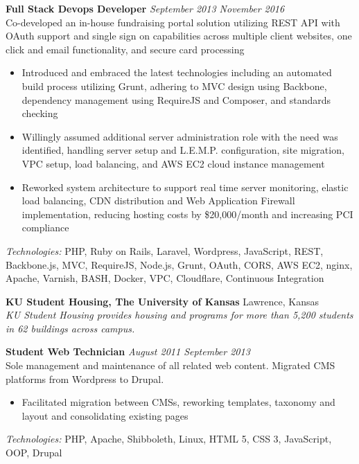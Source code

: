 \documentclass[10pt]{article}
\begin{document}
\begin{addmargin}[1em]{0em}
  \textbf{Full Stack Devops Developer} \hfill \textit{September 2013 \textendash{} November 2016} \\
  Co-developed an in-house fundraising portal solution utilizing REST API with OAuth support and single sign on capabilities across multiple client websites, one click and email functionality, and secure card processing \\
  \vspace{-1.1em}
  \begin{itemize}
    \item Introduced and embraced the latest technologies including an automated build process utilizing Grunt, adhering to MVC design using Backbone, dependency management using RequireJS and Composer, and standards checking
    \item Willingly assumed additional server administration role with the need was identified, handling server setup and L.E.M.P. configuration, site migration, VPC setup, load balancing, and AWS EC2 cloud instance management
    \item Reworked system architecture to support real time server monitoring, elastic load balancing, CDN distribution and Web Application Firewall implementation, reducing hosting costs by \$20,000/month and increasing PCI compliance
  \end{itemize}
  \textit{Technologies:} PHP, Ruby on Rails, Laravel, Wordpress, JavaScript, REST, Backbone.js, MVC, RequireJS, Node.js, Grunt, OAuth, CORS, AWS EC2, nginx, Apache, Varnish, BASH, Docker, VPC, Cloudflare, Continuous Integration
\end{addmargin}
\textbf{KU Student Housing, The University of Kansas} \hfill Lawrence, Kansas \\
\textit{KU Student Housing provides housing and programs for more than 5,200 students in 62 buildings across campus.} \\
\begin{addmargin}[1em]{0em}
  \textbf{Student Web Technician} \hfill \textit{August 2011 \textendash{} September 2013} \\
  Sole management and maintenance of all related web content. Migrated CMS platforms from Wordpress to Drupal. \\
  \vspace{-1.1em}
  \begin{itemize}
    \item Facilitated migration between CMSs, reworking templates, taxonomy and layout and consolidating existing pages
  \end{itemize}
  \textit{Technologies:} PHP, Apache, Shibboleth, Linux, HTML 5, CSS 3, JavaScript, OOP, Drupal
\end{addmargin}
\end{document}
